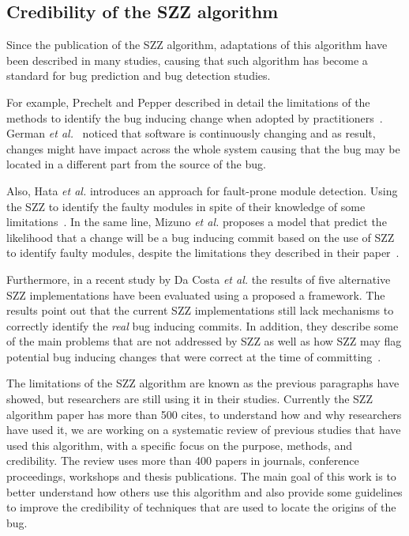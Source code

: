 \documentclass[a4paper]{article}
\begin{document}
\subsection{Credibility of the SZZ algorithm}

Since the publication of the SZZ algorithm, adaptations of this algorithm have been described in many studies, causing that such algorithm has become a standard for bug prediction and bug detection studies.

For example, Prechelt and Pepper described in detail the limitations of the methods to identify the bug inducing change when adopted by practitioners~\cite{prechelt2014software}. German \emph{et al.}~\cite{german2009change} noticed that software is continuously changing and as result, changes might have impact across the whole system causing that the bug may be located in a different part from the source of the bug.

Also, Hata \emph{et al.} introduces an approach for fault-prone module detection. Using the SZZ to  identify the faulty modules in spite of their knowledge of some limitations~\cite{hata2010fault}. In the same line, Mizuno \emph{et al.} proposes a model that predict the likelihood that a change will be a bug inducing commit based on the use of SZZ to identify faulty modules, despite the limitations they described in their paper~\cite{mizuno2010prediction}.

Furthermore, in a recent study by Da Costa \emph{et al.} the results of five alternative SZZ implementations have been evaluated using a proposed a framework. The results point out that the current SZZ implementations still lack mechanisms to correctly identify the \emph{real} bug inducing commits. In addition, they describe some of the main problems that are not addressed by SZZ as well as how SZZ may flag potential bug inducing changes that were correct at the time of committing~\cite{da2016framework}.

The limitations of the SZZ algorithm are known as the previous paragraphs have showed, but researchers are still using it in their studies. Currently the SZZ algorithm paper has more than 500 cites, to understand how and why researchers have used it, we are working on a systematic review of previous studies that have used this algorithm, with a specific focus on the purpose, methods, and credibility. The review uses more than 400 papers in journals, conference proceedings, workshops and thesis publications. The main goal of this work is to better understand how others use this algorithm and also provide some guidelines to improve the credibility of techniques that are used to locate the origins of the bug.
\end{document}
